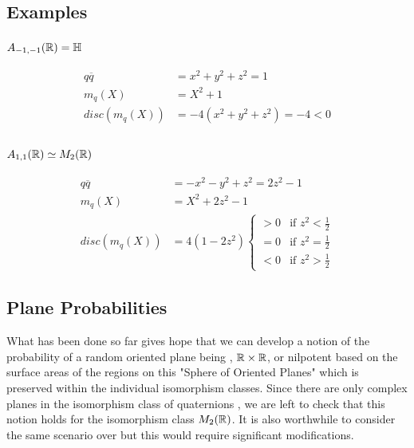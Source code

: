 \documentclass{article}
\begin{document}
\subsection{Examples}
\subsubsection{$A_{-1,-1}(\protect\mathbb{R}) = \protect\mathbb{H}$}
\begin{align*}
    q\overline{q} &= x^2 + y^2 + z^2 = 1 \\
    m_q(X) &= X^2 + 1 \\
    disc(m_q(X)) &= -4(x^2 + y^2 + z^2) = -4 < 0\\
\end{align*}

\subsubsection{$A_{1,1}(\protect\mathbb{R}) \simeq M_2(\protect\mathbb{R})$}
\begin{align*}
    q\overline{q} &= - x^2 - y^2 + z^2 = 2z^2 - 1 \\
    m_q(X) &= X^2 + 2z^2 - 1 \\
    disc(m_q(X)) &= 4(1-2z^2)
        \begin{cases} 
          > 0 & \text{if } z^2 < \frac{1}{2} \\
          = 0 & \text{if } z^2 = \frac{1}{2} \\
          < 0 & \text{if } z^2 > \frac{1}{2}
       \end{cases}
\end{align*}


\subsection{Plane Probabilities}
What has been done so far gives hope that we can develop a notion of the probability of a random oriented plane being \bC, $\protect\mathbb{R} \times \protect\mathbb{R}$, or nilpotent based on the surface areas of the regions on this "Sphere of Oriented Planes" which is preserved within the individual isomorphism classes. Since there are only complex planes \bC in the isomorphism class of quaternions \bH, we are left to check that this notion holds for the isomorphism class $M_2(\protect\mathbb{R})$. It is also worthwhile to consider the same scenario over \bQ but this would require significant modifications.
\end{document}

